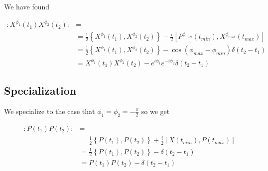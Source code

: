 \documentclass[12pt]{article}
\begin{document}
We have found

\begin{align}
:X^{\phi_1}(t_1)X^{\phi_2}(t_2): &=\\ 
&= \frac{1}{2}\left\{X^{\phi_1}(t_1), X^{\phi_2}(t_2)\right\} - \frac{i}{2}\left[P^{\phi_{min}}(t_{min}), X^{\phi_{max}}(t_{max})\right]\\
&= \frac{1}{2}\left\{X^{\phi_1}(t_1), X^{\phi_2}(t_2)\right\} - \cos(\phi_{max} - \phi_{min})\delta(t_2-t_1)\\
&= X^{\phi_1}(t_1)X^{\phi_2}(t_2) - e^{i\phi_1}e^{-i\phi_2}\delta(t_2-t_1)
\end{align}

\subsection{Specialization}

We specialize to the case that $\phi_1=\phi_2=-\frac{\pi}{2}$ so we get

\begin{align}
:P(t_1)P(t_2): &= \\
&= \frac{1}{2}\left\{P(t_1), P(t_2)\right\} + \frac{i}{2}\left[X(t_{min}), P(t_{max})\right]\\
&= \frac{1}{2}\left\{P(t_1), P(t_2)\right\} - \delta(t_2-t_1)\\
&= P(t_1)P(t_2) - \delta(t_2-t_1)
\end{align}
\end{document}
